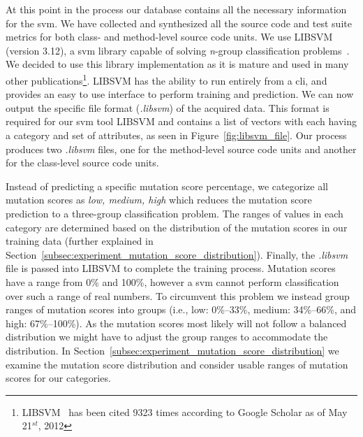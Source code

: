 At this point in the process our database contains all the necessary information for the \gls{svm}. We have collected and synthesized all the source code and test suite metrics for both class- and method-level source code units. We use LIBSVM (version 3.12), a \gls{svm} library capable of solving \emph{n}-group classification problems~\cite{CL11}. We decided to use this library implementation as it is mature and used in many other publications\footnote{LIBSVM~\cite{CL11} has been cited 9323 times according to Google Scholar as of May 21$^{st}$, 2012}. LIBSVM has the ability to run entirely from a \gls{cli}, and provides an easy to use interface to perform training and prediction. We can now output the specific file format (\emph{.libsvm}) of the acquired data. This format is required for our \gls{svm} tool LIBSVM and contains a list of vectors with each having a category and set of attributes, as seen in Figure~\ref{fig:libsvm_file}. Our process produces two \emph{.libsvm} files, one for the method-level source code units and another for the class-level source code units.

Instead of predicting a specific mutation score percentage, we categorize all mutation scores as \textit{low, medium, high} which reduces the mutation score prediction to a three-group classification problem. The ranges of values in each category are determined based on the distribution of the mutation scores in our training data (further explained in Section~\ref{subsec:experiment_mutation_score_distribution}). Finally, the \emph{.libsvm} file is passed into LIBSVM to complete the training process. Mutation scores have a range from 0\% and 100\%, however a \gls{svm} cannot perform classification over such a range of real numbers. To circumvent this problem we instead group ranges of mutation scores into groups (i.e., low: 0\%--33\%, medium: 34\%--66\%, and high: 67\%--100\%). As the mutation scores most likely will not follow a balanced distribution we might have to adjust the group ranges to accommodate the distribution. In Section~\ref{subsec:experiment_mutation_score_distribution} we examine the mutation score distribution and consider usable ranges of mutation scores for our categories.


